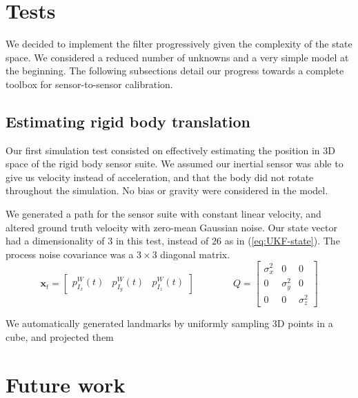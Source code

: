 \documentclass[letterpaper]{article}
\newcommand{\bb}[1]{\mathbf{#1}}
\begin{document}
\section{Tests}

We decided to implement the filter progressively given the complexity
of the state space. We considered a reduced number of unknowns and a
very simple model at the beginning. The following subsections detail
our progress towards a complete toolbox for sensor-to-sensor
calibration.

\subsection{Estimating rigid body translation}

Our first simulation test consisted on effectively estimating the
position in 3D space of the rigid body sensor suite. We assumed our
inertial sensor was able to give us velocity instead of acceleration,
and that the body did not rotate throughout the simulation. No bias
or gravity were considered in the model.

We generated a path for the sensor suite with constant linear
velocity, and altered ground truth velocity with zero-mean Gaussian
noise. Our state vector had a dimensionality of $3$ in this test,
instead of $26$ as in (\ref{eq:UKF-state}). The process noise
covariance was a $3 \times 3$ diagonal matrix.
\begin{equation}
\bb{x}_t=\begin{bmatrix} p_{I_x}^W(t) & p_{I_y}^W(t) & p_{I_z}^W(t) \end{bmatrix} 
\hspace{4em}
Q = \begin{bmatrix} 
\sigma_x^2 & 0 & 0\\ 
0 & \sigma_y^2 & 0\\ 
0 & 0 & \sigma_z^2
\end{bmatrix} 
\label{eq:TranslationTest-stateVec}
\end{equation}

We automatically generated landmarks by uniformly sampling
3D points in a cube, and projected them 

\section{Future work}

\end{document}
